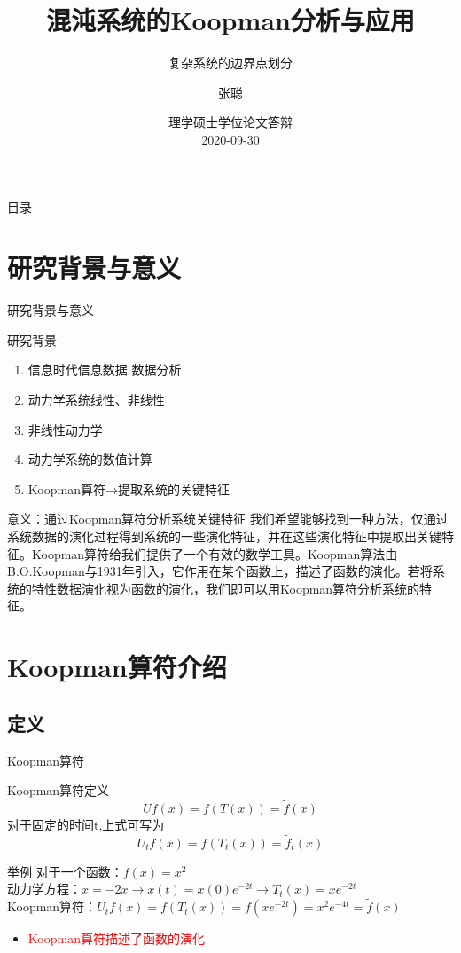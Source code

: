 \documentclass{beamer}
\title[混沌系统的Koopman分析与应用]{\LARGE 混沌系统的Koopman分析与应用}
\subtitle{复杂系统的边界点划分}
\author{张聪}
\institute[北京邮电大学理学院(系统科学)]{指导教师：兰岳恒\\北京邮电大学理学院}
\date[理学硕士学位论文答辩]{理学硕士学位论文答辩\\2020-09-30}
\begin{document}
\kaishu

\begin{frame}
\titlepage
\end{frame}

\begin{frame}{目录}
\tableofcontents[pausesections]
\end{frame}

\section{研究背景与意义}
		\begin{frame}{研究背景与意义}
		\begin{block}{研究背景}
		\begin{enumerate}
			\item 信息时代\textrightarrow 信息\textrightarrow 数据 \textrightarrow 数据分析
			\item 动力学系统\textrightarrow 线性、非线性
			\item 非线性动力学
			\item 动力学系统的数值计算
			\item Koopman算符→提取系统的关键特征
		\end{enumerate}
		\end{block}
		\begin{block}{意义：通过Koopman算符分析系统关键特征}
\indent 我们希望能够找到一种方法，仅通过系统数据的演化过程得到系统的一些演化特征，并在这些演化特征中提取出关键特征。Koopman算符给我们提供了一个有效的数学工具。Koopman算法由B.O.Koopman与1931年引入，它作用在某个函数上，描述了函数的演化。若将系统的特性数据演化视为函数的演化，我们即可以用Koopman算符分析系统的特征。
		\end{block}
		\end{frame}
		
\section{Koopman算符介绍}
	\subsection{定义}
	\begin{frame}{Koopman算符}
	\begin{block}{Koopman算符定义}
		$$Uf\left( x\right)=f\left(T\left( x\right)\right)=\tilde{f}\left( x\right)$$
		对于固定的时间t,上式可写为
		$$U_tf\left( x\right)=f\left(T_t\left( x\right)\right)=\tilde{f}_t\left( x\right)$$
	\end{block}
	\begin{block}{举例}
	对于一个函数：$f(x)=x^2$\\
	动力学方程：$\dot{x}=-2x \rightarrow x(t)=x(0)e^{-2t} \rightarrow T_t(x)=xe^{-2t}$\\
	Koopman算符：$U_tf(x)=f(T_t(x))=f(xe^{-2t})=x^2e^{-4t}=\tilde{f}(x)$
	\end{block}
	\begin{itemize}
		\item 	\textcolor{red}{Koopman算符描述了函数的演化}
	\end{itemize}
	\end{frame}
\end{document}
